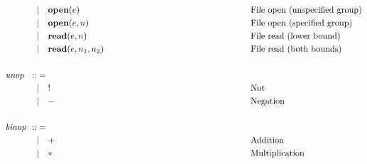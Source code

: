 \begin{fleqn}
\begin{align*}
                 &                                  &    & | \ \ \ \textbf{open}(e)              &  & \hspace*{5.6cm}\text{File open (unspecified group)}    \\
                 &                                  &    & | \ \ \ \textbf{open}(e, n)           &  & \hspace*{5.6cm}\text{File open (specified group)}      \\
                 &                                  &    & | \ \ \ \textbf{read}(e, n)           &  & \hspace*{5.6cm}\text{File read (lower bound)}          \\
                 &                                  &    & | \ \ \ \textbf{read}(e, n_1, n_2)    &  & \hspace*{5.6cm}\text{File read (both bounds)}          \\
                 &                                  &    &                                       &  &                                                        \\
                 & \textit{unop}\hspace{-0.1cm}     & :: & =                                     &  &                                                        \\
                 &                                  &    & | \ \ \ !                             &  & \hspace*{5.6cm}\text{Not}                              \\
                 &                                  &    & | \ \ \ -                             &  & \hspace*{5.6cm}\text{Negation}                         \\
                 &                                  &    &                                       &  &                                                        \\
                 & \textit{binop}\hspace{-0.1cm}    & :: & =                                     &  &                                                        \\
                 &                                  &    & | \ \ \ +                             &  & \hspace*{5.6cm}\text{Addition}                         \\
                 &                                  &    & | \ \ \ *                             &  & \hspace*{5.6cm}\text{Multiplication}                   \\

\end{align*}
\end{fleqn}
